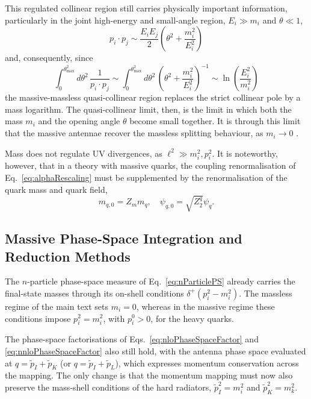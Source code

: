 This regulated collinear region still carries physically important information,
particularly in the joint high-energy and small-angle region,
$E_i\gg m_i$ and $\theta\ll1$,
\begin{equation}
    p_i\cdot p_j\sim\frac{E_iE_j}{2}\left(\theta^2+\frac{m_i^2}{E_i^2}\right)
\end{equation}
and, consequently, since
\begin{equation}
    \int_0^{\theta_\text{max}^2} d\theta^2\,\frac{1}{p_i\cdot p_j}\sim\int_0^{\theta_\text{max}^2} d\theta^2\,\left(\theta^2+\frac{m_i^2}{E_i^2}\right)^{-1}\sim\ln\!\left(\frac{E_i^2}{m_i^2}\right)
\end{equation}
the massive-massless quasi-collinear region replaces the strict collinear pole by
a mass logarithm. The
quasi-collinear limit, then, is the limit in which both the mass $m_i$ and the opening angle
$\theta$ become small together. It is through this limit that the massive antennae
recover the massless splitting behaviour, as $m_i\to 0$ \cite{GehrmannDeRidder:2009fz}.

Mass does not regulate UV divergences, as $\ell^2\gg m_i^2,p_i^2$. It is noteworthy,
however, that in a theory with massive quarks, the coupling renormalisation of
Eq.~\eqref{eq:alphaRescaling} must be supplemented by the renormalisation of the quark mass
and quark field,
\begin{equation}
    m_{q,0} = Z_m m_q,\quad \psi_{q,0} = \sqrt{Z_2^q}\psi_q.
\end{equation}

\subsection{Massive Phase-Space Integration and Reduction Methods}

The $n$-particle phase-space measure of Eq.~\eqref{eq:nParticlePS} already carries the
final-state masses through its on-shell conditions $\delta^+(p_i^2-m_i^2)$. The massless
regime of the main text sets $m_i=0$, whereas in the massive regime these conditions
impose $p_i^2=m_i^2$, with $p_i^0>0$, for the heavy quarks.

The phase-space factorisations of Eqs.~\eqref{eq:nloPhaseSpaceFactor} and
\eqref{eq:nnloPhaseSpaceFactor} also still hold, with the antenna phase space evaluated
at $q=\tilde p_I+\tilde p_K$ (or $q=\tilde p_I+\tilde p_L$), which expresses momentum
conservation across the mapping. The only change is that the momentum mapping must now
also preserve the mass-shell conditions of the hard radiators, $\tilde p_I^2 = m_i^2$ and
$\tilde p_K^2 = m_k^2$.

